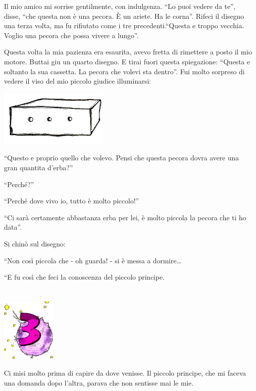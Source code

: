 \documentclass[11pt]{scrbook}
\begin{document}
Il mio amico mi sorrise gentilmente, con indulgenza. ``Lo puoi vedere da
te'', disse, ``che questa non è una pecora. È un ariete. Ha le corna''.
Rifeci il disegno una terza volta, ma fu rifiutato come i tre
precedenti.``Questa e troppo vecchia. Voglio una pecora che possa vivere
a lungo''.

Questa volta la mia pazienza era esaurita, avevo fretta di rimettere a
posto il mio motore. Buttai giu un quarto disegno. E tirai fuori questa
spiegazione: ``Questa e soltanto la sua cassetta. La pecora che volevi
sta dentro''. Fui molto sorpreso di vedere il viso del mio piccolo
giudice illuminarsi:

\begin{center}
\includegraphics{./img/2e.png}
\end{center}

``Questo e proprio quello che volevo. Pensi che questa pecora dovra
avere una gran quantita d'erba?''

``Perché?''

``Perché dove vivo io, tutto è molto piccolo!''

``Ci sarà certamente abbastanza erba per lei, è molto piccola la pecora
che ti ho data''.

Si chinò sul disegno:

``Non così piccola che - oh guarda! - si è messa a dormire\ldots{}

``E fu così che feci la conoscenza del piccolo principe.

\chapter{}
\begin{center}
\includegraphics{./img/chapter3.png}
\end{center}

Ci misi molto prima di capire da dove venisse. Il piccolo principe, che
mi faceva una domanda dopo l'altra, parava che non sentisse mai le mie.
\end{document}
